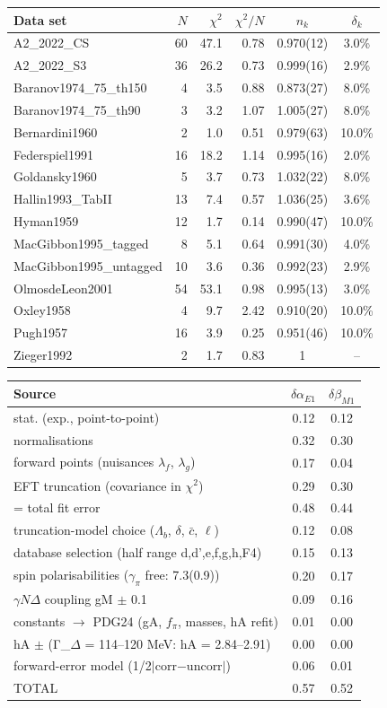 \begin{tabular}{lrrrcc}
\hline
Data set & $N$ & $\chi^2$ & $\chi^2/N$ & $n_k$ & $\delta_k$ \\
\hline
A2\_2022\_CS & 60 & 47.1 & 0.78 & 0.970(12) & 3.0\% \\
A2\_2022\_S3 & 36 & 26.2 & 0.73 & 0.999(16) & 2.9\% \\
Baranov1974\_75\_th150 & 4 & 3.5 & 0.88 & 0.873(27) & 8.0\% \\
Baranov1974\_75\_th90 & 3 & 3.2 & 1.07 & 1.005(27) & 8.0\% \\
Bernardini1960 & 2 & 1.0 & 0.51 & 0.979(63) & 10.0\% \\
Federspiel1991 & 16 & 18.2 & 1.14 & 0.995(16) & 2.0\% \\
Goldansky1960 & 5 & 3.7 & 0.73 & 1.032(22) & 8.0\% \\
Hallin1993\_TabII & 13 & 7.4 & 0.57 & 1.036(25) & 3.6\% \\
Hyman1959 & 12 & 1.7 & 0.14 & 0.990(47) & 10.0\% \\
MacGibbon1995\_tagged & 8 & 5.1 & 0.64 & 0.991(30) & 4.0\% \\
MacGibbon1995\_untagged & 10 & 3.6 & 0.36 & 0.992(23) & 2.9\% \\
OlmosdeLeon2001 & 54 & 53.1 & 0.98 & 0.995(13) & 3.0\% \\
Oxley1958 & 4 & 9.7 & 2.42 & 0.910(20) & 10.0\% \\
Pugh1957 & 16 & 3.9 & 0.25 & 0.951(46) & 10.0\% \\
Zieger1992 & 2 & 1.7 & 0.83 & 1 & -- \\
\hline
\end{tabular}

\begin{tabular}{lcc}
\hline
Source & $\delta\alpha_{E1}$ & $\delta\beta_{M1}$ \\
\hline
stat. (exp., point-to-point) & 0.12 & 0.12 \\
normalisations & 0.32 & 0.30 \\
forward points (nuisances $\lambda_f$, $\lambda_g$) & 0.17 & 0.04 \\
EFT truncation (covariance in $\chi^2$) & 0.29 & 0.30 \\
= total fit error & 0.48 & 0.44 \\
truncation-model choice ($\Lambda_b$, $\delta$, $\bar c$, $\ell$) & 0.12 & 0.08 \\
database selection (half range d,d',e,f,g,h,F4) & 0.15 & 0.13 \\
spin polarisabilities ($\gamma_\pi$ free: 7.3(0.9)) & 0.20 & 0.17 \\
$\gamma N\Delta$ coupling gM $\pm$ 0.1 & 0.09 & 0.16 \\
constants $\to$ PDG24 (gA, $f_\pi$, masses, hA refit) & 0.01 & 0.00 \\
hA $\pm$ (Γ\_$\Delta$ = 114–120 MeV: hA = 2.84–2.91) & 0.00 & 0.00 \\
forward-error model (1/2$|$corr$-$uncorr$|$) & 0.06 & 0.01 \\
TOTAL & 0.57 & 0.52 \\
\hline
\end{tabular}

